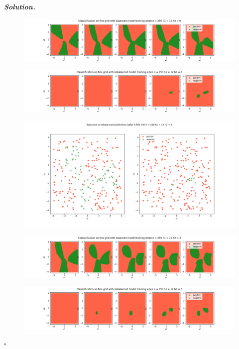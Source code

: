 \documentclass[10pt]{article}
\newenvironment{solution}[1][\it{Solution}]{\textbf{#1. } }{$\square$}
\begin{document}
\begin{solution}
\begin{figure}[H]
\includegraphics[width=16cm, keepaspectratio]{./3/14}
\end{figure}
\begin{figure}[H]
\includegraphics[width=16cm, keepaspectratio]{./3/15}
\end{figure}
\begin{figure}[H]
\includegraphics[width=16cm, keepaspectratio]{./3/16}
\end{figure}
\begin{figure}[H]
\includegraphics[width=16cm, keepaspectratio]{./3/17}
\end{figure}
\begin{figure}[H]
\includegraphics[width=16cm, keepaspectratio]{./3/18}

\end{figure}
\end{solution}
\end{document}
